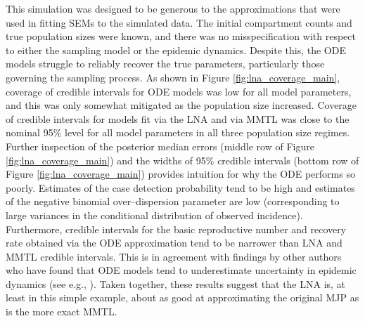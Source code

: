 This simulation was designed to be generous to the approximations that were used in fitting SEMs to the simulated data. The initial compartment counts and true population sizes were known, and there was no misspecification with respect to either the sampling model or the epidemic dynamics. Despite this, the ODE models struggle to reliably recover the true parameters, particularly those governing the sampling process. As shown in Figure \ref{fig:lna_coverage_main}, coverage of credible intervals for ODE models was low for all model parameters, and this was only somewhat mitigated as the population size increased. Coverage of credible intervals for models fit via the LNA and via MMTL was close to the nominal 95\% level for all model parameters in all three population size regimes. Further inspection of the posterior median errors (middle row of Figure \ref{fig:lna_coverage_main}) and the widths of 95\% credible intervals (bottom row of Figure \ref{fig:lna_coverage_main}) provides intuition for why the ODE performs so poorly. Estimates of the case detection probability tend to be high and estimates of the negative binomial over--dispersion parameter are low (corresponding to large variances in the conditional distribution of observed incidence). Furthermore, credible intervals for the basic reproductive number and recovery rate obtained via the ODE approximation tend to be narrower than LNA and MMTL credible intervals. This is in agreement with findings by other authors who have found that ODE models tend to underestimate uncertainty in epidemic dynamics (see e.g., \cite{king2015avoidable}). Taken together, these results suggest that the LNA is, at least in this simple example, about as good at approximating the original MJP as is the more exact MMTL. 

